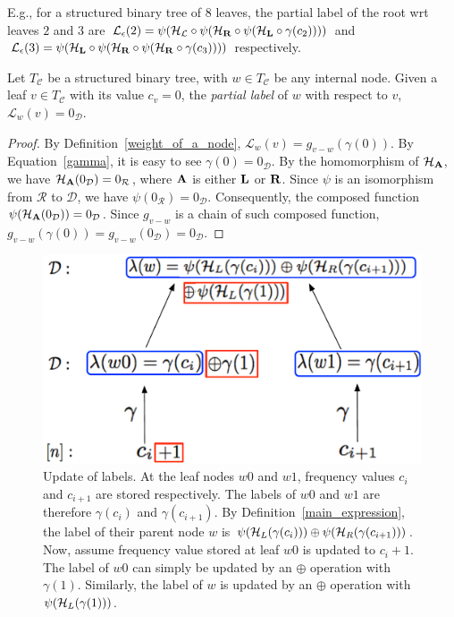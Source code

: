 E.g., for a structured binary tree of $8$ leaves, the partial label of the root wrt leaves $2$ and $3$ 
are $\mathcal{L}_\epsilon(2)={\psi}({\bf {\cal {\cal H}_{L}}} \circ {\psi} ( {\bf {\cal H}_{R}} \circ {\psi} ({\bf {\cal H}_{L}} \circ \gamma (c_{2}) )))$ and $\mathcal{L}_\epsilon(3)={\psi}({\bf {\cal H}_{L}} \circ {\psi} ( {\bf {\cal H}_{R}} \circ {\psi} ({\bf {\cal H}_{R}} \circ \gamma (c_{3}) )))$ respectively. 

\begin{corol}\label{prune}
Let $T_\mathcal{C}$ be a structured binary tree, with $w \in T_\mathcal{C}$ be any internal node. Given a leaf $v \in T_\mathcal{C}$ with its value $c_{v}=0$, the \emph{partial label} of $w$ with respect to $v$, $\mathcal{L}_w(v)= 0_{\mathcal{D}}$.
\end{corol}
\begin{proof}
By Definition~\ref{weight_of_a_node}, $\mathcal{L}_w(v)= g_{v-w}(\gamma (0))$. By Equation~\ref{gamma}, it is easy to see $\gamma (0) = 0_{\mathcal{D}}$. By the homomorphism of ${\bf {\cal H}_{A}}$, we have ${\bf {\cal H}_{A}}(0_{\mathcal{D}}) = 0_{\mathcal{R}}$, where $\bf A$ is either $\bf L$ or $\bf R$. Since $\psi$ is an isomorphism from ${\mathcal{R}}$ to ${\mathcal{D}}$, we have $\psi(0_{\mathcal{R}}) = 0_{\mathcal{D}}$. Consequently, the composed function $\psi ( {\bf {\cal H}_{A}} (0_{\mathcal{D}}))=0_{\mathcal{D}}$. Since $g_{v-w}$ is a chain of such composed function, $g_{v-w}(\gamma (0)) = g_{v-w} (0_{\mathcal{D}}) =0_{\mathcal{D}}$.
\end{proof}

\begin{figure}[h!]
\centering
\includegraphics[scale = 0.4]{fig/update_illustrate.pdf}
\caption{Update of labels. At the leaf nodes $w0$ and $w1$, frequency values $c_{i}$ and $c_{i+1}$ are stored respectively. The labels of $w0$ and $w1$ are therefore $\gamma(c_{i})$ and $\gamma(c_{i+1})$. By Definition~\ref{main_expression}, the label of their parent node $w$ is $\psi ( {\cal H}_{L} ( \gamma (c_{i})))  \oplus \psi ( {\cal H}_{R} ( \gamma (c_{i+1}) ))$. Now, assume frequency value stored at leaf $w0$ is updated to $c_{i}+1$. The label of $w0$ can simply be updated by an $\oplus$ operation with $\gamma(1)$. Similarly, the label of $w$ is updated by an $\oplus$ operation with $\psi ( {\cal H}_{L} ( \gamma (1) ))$.}\label{label_update}
\end{figure}

